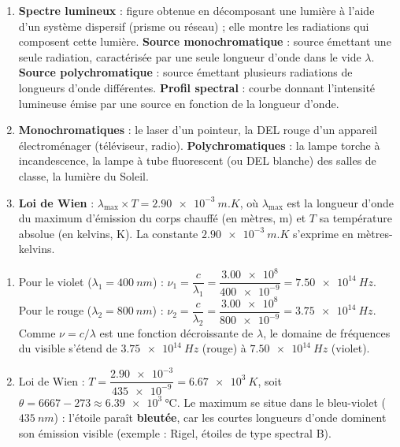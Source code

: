 \documentclass[11pt]{article}
\newcommand{\cle}[1]{{\popxbold\color{popdark}#1}}
\begin{document}
\begin{corrige}
\begin{enumerate}
\item \textbf{\cle{Spectre lumineux}} : figure obtenue en décomposant une lumière à l'aide d'un système \cle{dispersif} (prisme ou réseau) ; elle montre les radiations qui composent cette lumière. \textbf{\cle{Source monochromatique}} : source émettant une seule radiation, caractérisée par une seule longueur d'onde dans le vide $\lambda$. \textbf{\cle{Source polychromatique}} : source émettant plusieurs radiations de longueurs d'onde différentes. \textbf{\cle{Profil spectral}} : courbe donnant l'intensité lumineuse émise par une source en fonction de la longueur d'onde.
\item \textbf{Monochromatiques} : le laser d'un pointeur, la DEL rouge d'un appareil électroménager (téléviseur, radio). \textbf{Polychromatiques} : la lampe torche à incandescence, la lampe à tube fluorescent (ou DEL blanche) des salles de classe, la lumière du Soleil.
\item \textbf{Loi de Wien} : $\lambda_{\max} \times T = \SI{2,90e-3}{m.K}$, où $\lambda_{\max}$ est la longueur d'onde du maximum d'émission du corps chauffé (en mètres, m) et $T$ sa \cle{température absolue} (en kelvins, K). La constante $\SI{2,90e-3}{m.K}$ s'exprime en mètres-kelvins.
\end{enumerate}
\end{corrige}

\begin{corrige}
\begin{enumerate}
\item Pour le violet ($\lambda_1 = \SI{400}{nm}$) : $\nu_1 = \dfrac{c}{\lambda_1} = \dfrac{\num{3,00e8}}{\num{400e-9}} = \SI{7,50e14}{Hz}$. Pour le rouge ($\lambda_2 = \SI{800}{nm}$) : $\nu_2 = \dfrac{c}{\lambda_2} = \dfrac{\num{3,00e8}}{\num{800e-9}} = \SI{3,75e14}{Hz}$. Comme $\nu = c/\lambda$ est une fonction décroissante de $\lambda$, le domaine de fréquences du visible s'étend de $\SI{3,75e14}{Hz}$ (rouge) à $\SI{7,50e14}{Hz}$ (violet).
\item Loi de Wien : $T = \dfrac{\num{2,90e-3}}{\num{435e-9}} = \SI{6,67e3}{K}$, soit $\theta = 6667 - 273 \approx \SI{6,39e3}{\celsius}$. Le maximum se situe dans le bleu-violet ($\SI{435}{nm}$) : l'étoile paraît \textbf{bleutée}, car les courtes longueurs d'onde dominent son émission visible (exemple : Rigel, étoiles de type spectral B).
\end{enumerate}
\end{corrige}
\end{document}
